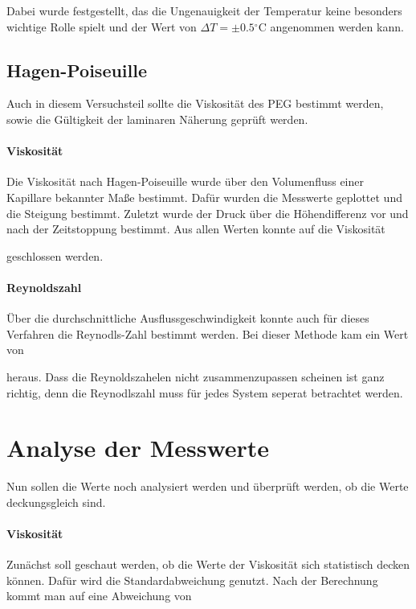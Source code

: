 
Dabei wurde festgestellt, das die Ungenauigkeit der Temperatur keine besonders wichtige Rolle spielt und der Wert von $\Delta T = \pm 0.5  \mathrm{^\circ C}$ angenommen werden kann.

\subsection{Hagen-Poiseuille}
Auch in diesem Versuchsteil sollte die Viskosität des PEG bestimmt werden, sowie die Gültigkeit der laminaren Näherung geprüft werden.

\paragraph{Viskosität}
Die Viskosität nach Hagen-Poiseuille wurde über den Volumenfluss einer Kapillare bekannter Maße bestimmt. Dafür wurden die Messwerte geplottet und die Steigung bestimmt. Zuletzt wurde der Druck über die Höhendifferenz vor und nach der Zeitstoppung bestimmt. Aus allen Werten konnte auf die Viskosität 


geschlossen werden.

\paragraph{Reynoldszahl}
Über die durchschnittliche Ausflussgeschwindigkeit konnte auch für dieses Verfahren die Reynodls-Zahl bestimmt werden. Bei dieser Methode kam ein Wert von 


heraus. Dass die Reynoldszahelen nicht zusammenzupassen scheinen ist ganz richtig, denn die Reynodlszahl muss für jedes System seperat betrachtet werden. 

\section{Analyse der Messwerte}
\label{sec:Analyse}
Nun sollen die Werte noch analysiert werden und überprüft werden, ob die Werte deckungsgleich sind. 

\paragraph{Viskosität} Zunächst soll geschaut werden, ob die Werte der Viskosität sich statistisch decken können. Dafür wird die Standardabweichung genutzt. Nach der Berechnung kommt man auf eine Abweichung von

